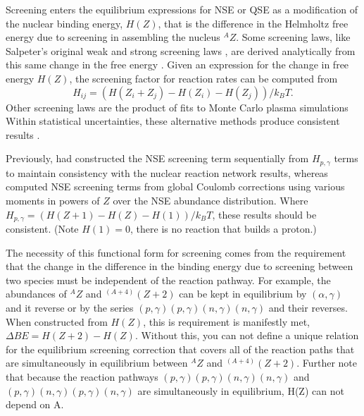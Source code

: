\documentclass[12pt,modern,tighten,times,apj]{aastex61}
\begin{document}
Screening enters the equilibrium expressions for NSE or QSE as a modification of the nuclear binding energy, $H(Z)$, that is the difference in the Helmholtz free energy due to screening in assembling the nucleus $^AZ$.
Some screening laws, like Salpeter's original weak and strong screening laws \citep{Salp54}, are derived analytically from this same change in the free energy \citep[see also][]{DeGrCo73}.  
Given an expression for the change in free energy $H(Z)$, the screening factor for reaction rates can be computed from 
\begin{equation}
H_{ij} = (H(Z_i+Z_j)-H(Z_i)-H(Z_j))/k_B T.
\end{equation} 
Other screening laws are the product of fits to Monte Carlo plasma simulations \citep[see, for example,]{OgIyIc91}
Within statistical uncertainties, these alternative methods produce consistent results \citep[see, for example,][]{DeSl99,Rose92}.

Previously, \citet{HiTh96} had constructed the NSE screening term sequentially from $H_{p,\gamma}$ terms to maintain consistency with the nuclear reaction network results, whereas \citet{BrGa99} computed NSE screening terms from global Coulomb corrections using various moments in powers of $Z$ over the NSE abundance distribution.  
Where $H_{p,\gamma} = (H(Z+1)-H(Z)-H(1))/k_B T$, these results should be consistent. (Note $H(1)=0$, there is no reaction that builds a proton.)  

The necessity of this functional form for screening comes from the requirement that the change in the difference in the binding energy due to screening between two species must be independent of the reaction pathway.  
For example, the abundances of $^AZ$ and $^{(A+4)}(Z+2)$ can be kept in equilibrium by $(\alpha,\gamma)$ and it reverse or by the series $(p,\gamma) (p,\gamma) (n,\gamma) (n,\gamma)$ and their reverses. 
When constructed from $H(Z)$, this is requirement is manifestly met, $\Delta BE = H(Z+2)-H(Z)$.
Without this, you can not define a unique relation for the equilibrium screening correction that covers all of the reaction paths that are simultaneously in equilibrium between $^AZ$ and $^{(A+4)}(Z+2)$.
Further note that because the reaction pathways $(p,\gamma) (p,\gamma) (n,\gamma) (n,\gamma)$ and $(p,\gamma) (n,\gamma) (p,\gamma) (n,\gamma)$ are simultaneously in equilibrium, H(Z) can not depend on A.
\end{document}
